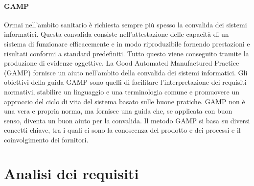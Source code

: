   \paragraph{GAMP}
  Ormai nell'ambito sanitario è richiesta sempre più spesso la convalida dei sistemi informatici. Questa 
  convalida consiste nell'attestazione delle capacità di un sistema di funzionare efficacemente e in modo 
  riproduzibile fornendo prestazioni e risultati conformi a standard predefiniti. Tutto questo viene conseguito 
  tramite la produzione di evidenze oggettive.
  La Good Automated Manufactured Practice (GAMP) fornisce un aiuto nell'ambito della convalida dei sistemi informatici. 
  Gli obiettivi della guida GAMP sono quelli di facilitare l'interpretazione dei requisiti normativi, 
  stabilire un linguaggio e una terminologia comune e promuovere un approccio del ciclo di vita del sistema 
  basato sulle buone pratiche. GAMP non è una vera e propria norma, ma fornisce una guida che, se applicata 
  con buon senso, diventa un buon aiuto per la convalida. 
  Il metodo GAMP si basa su diversi concetti chiave, tra i quali ci sono la conoscenza del prodotto e dei processi e 
  il coinvolgimento dei fornitori.



  \section{Analisi dei requisiti}
